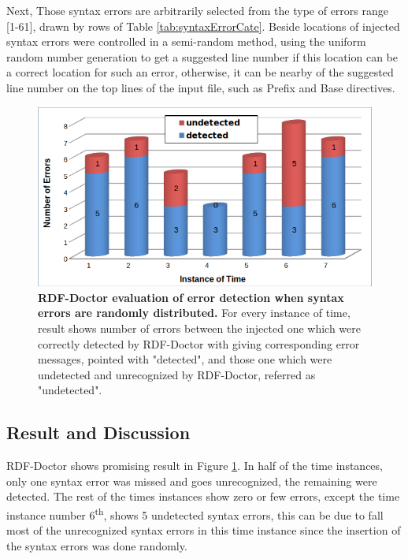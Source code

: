  Next, Those syntax errors are arbitrarily selected from the type of errors range [1-61], drawn by rows of Table \ref{tab:syntaxErrorCate}. Beside locations of injected syntax errors were controlled in a semi-random method, using the uniform random number generation to get a suggested line number if this location can be a correct location for such an error, otherwise, it can be nearby of the suggested line number on the top lines of the input file, such as Prefix and Base directives.   

	\begin{figure}[ht]
	\begin{center}
		\includegraphics[scale=0.7,angle=0]{images/Experiment02-02.png}
		\setlength\belowcaptionskip{-5mm}
		\caption{\textbf{RDF-Doctor evaluation of error detection when syntax errors are randomly distributed.} For every instance of time, result shows number of errors between the injected one which were correctly detected by RDF-Doctor with giving corresponding error messages, pointed with "detected", and those one which were undetected and unrecognized by RDF-Doctor, referred as "undetected".} 
		\label{Fig:Experiment02-02}
	\end{center}
\end{figure}
\subsection{Result and Discussion}
RDF-Doctor shows promising result in Figure \ref{Fig:Experiment02-02}. In half of the time instances, only one syntax error was missed and goes unrecognized, the remaining were detected. The rest of the times instances show zero or few errors, except the time instance number 6\textsuperscript{th}, shows 5 undetected syntax errors, this can be due to fall most of the unrecognized syntax errors in this time instance since the insertion of the syntax errors was done randomly.  

